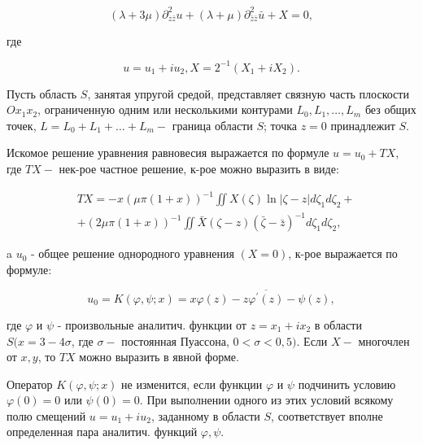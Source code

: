 \documentclass[10pt]{article}
\begin{document}
\[

(\lambda+3 \mu) \partial_{z \bar{z}}^{2} u+(\lambda+\mu) \partial_{\bar{z} \bar{z}}^{2} \bar{u}+X=0,

\]



где



\[

u=u_{1}+i u_{2}, X=2^{-1}\left(X_{1}+i X_{2}\right) .

\]



Пусть область $S$, занятая упругой средой, представляет связную часть плоскости $O x_{1} x_{2}$, ограниченную одним или несколькими контурами $L_{0}, L_{1}, \ldots, L_{m}$ без общих точек, $L=L_{0}+L_{1}+\ldots+L_{m}-$ граница области $S$; точка $z=0$ принадлежит $S$.



Искомое решение уравнения равновесия выражается по формуле $u=u_{0}+T X$, где $T X-$ нек-рое частное решение, к-рое можно выразить в виде:



\[

\begin{aligned}

& T X=-x(\mu \pi(1+x))^{-1} \iint X(\zeta) \ln |\zeta-z| d \zeta_{1} d \zeta_{2}+ \\

& +(2 \mu \pi(1+x))^{-1} \iint \bar{X}(\zeta-z)(\bar{\zeta}-\bar{z})^{-1} d \zeta_{1} d \zeta_{2},

\end{aligned}

\]



a $u_{0}$ - общее решение однородного уравнения $(X=0)$, к-рое выражается по формуле:



\[

u_{0}=K(\varphi, \psi ; x)=x \varphi(z)-z \overline{\varphi^{\prime}(z)}-\psi(z),

\]



где $\varphi$ и $\psi$ - произвольные аналитич. функции от $z=x_{1}+i x_{2}$ в области $S(x=3-4 \sigma$, где $\sigma-$ постоянная Пуассона, $0<\sigma<0,5)$. Если $X-$ многочлен от $x, y$, то $T X$ можно выразить в явной форме.



Оператор $K(\varphi, \psi ; x)$ не изменится, если функции $\varphi$ и $\psi$ подчинить условию $\varphi(0)=0$ или $\psi(0)=0$. При выполнении одного из этих условий всякому полю смещений $u=u_{1}+i u_{2}$, заданному в области $S$, соответствует вполне определенная пара аналитич. функций $\varphi, \psi$.
\end{document}
